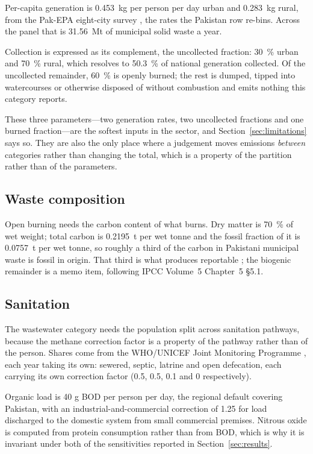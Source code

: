 Per-capita generation is \SI{0.453}{\kilo\gram} per person per day urban and
\SI{0.283}{\kilo\gram} rural, from the Pak-EPA eight-city survey \citep{pakepa1996}, the
rates the \citet{kaza2018} Pakistan row re-bins. Across the panel that is
\SI{31.56}{\mega\tonne} of municipal solid waste a year.

Collection is expressed as its complement, the uncollected fraction: \SI{30}{\percent} urban
and \SI{70}{\percent} rural, which resolves to \SI{50.3}{\percent} of national generation
collected. Of the uncollected remainder, \SI{60}{\percent} is openly burned; the rest is
dumped, tipped into watercourses or otherwise disposed of without combustion and emits nothing
this category reports.

These three parameters---two generation rates, two uncollected fractions and one burned
fraction---are the softest inputs in the sector, and Section~\ref{sec:limitations} says so.
They are also the only place where a judgement moves emissions \emph{between} categories
rather than changing the total, which is a property of the partition rather than of the
parameters.

\subsection{Waste composition}

Open burning needs the carbon content of what burns. Dry matter is \SI{70}{\percent} of wet
weight; total carbon is \SI{0.2195}{\tonne} per wet tonne and the fossil fraction of it is
\SI{0.0757}{\tonne} per wet tonne, so roughly a third of the carbon in Pakistani municipal
waste is fossil in origin. That third is what produces reportable \COtwo{}; the biogenic
remainder is a memo item, following IPCC Volume~5 Chapter~5 \S5.1.

\subsection{Sanitation}

The wastewater category needs the population split across sanitation pathways, because the
methane correction factor is a property of the pathway rather than of the person. Shares come
from the WHO/UNICEF Joint Monitoring Programme \citep{jmp2023}, each year taking its own:
sewered, septic, latrine and open defecation,
each carrying its own correction factor (\num{0.5}, \num{0.5}, \num{0.1} and \num{0}
respectively).

Organic load is \SI{40}{} g BOD per person per day, the regional default covering Pakistan,
with an industrial-and-commercial correction of \num{1.25} for load discharged to the domestic
system from small commercial premises. Nitrous oxide is computed from protein consumption
rather than from BOD, which is why it is invariant under both of the sensitivities reported
in Section~\ref{sec:results}.

